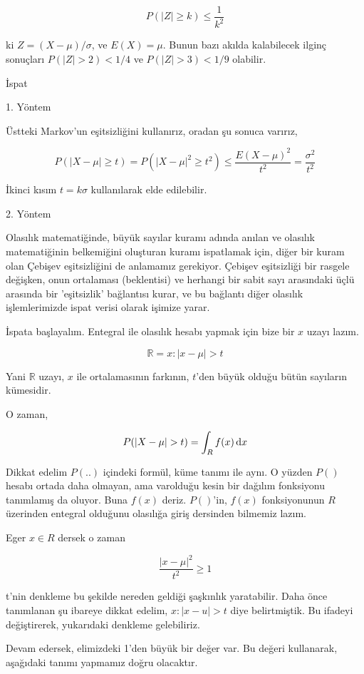 \documentclass[12pt,fleqn]{article}\usepackage{../../common}
\begin{document}
$$ P(|Z| \ge k) \le \frac{1}{k^2}$$

ki $Z = (X-\mu)/\sigma$, ve $E(X) = \mu$. Bunun bazı akılda kalabilecek
ilginç sonuçları $P(|Z| > 2) < 1/4$ ve $P(|Z| > 3) < 1/9$ olabilir.

İspat

1. Yöntem

Üstteki Markov'un eşitsizliğini kullanırız, oradan şu sonuca varırız, 

$$ 
P(|X-\mu| \ge t) = P(|X-\mu|^2 \ge t^2 ) \le \frac{E(X-\mu)^2}{t^2} 
= \frac{\sigma^2}{t^2}  
$$

İkinci kısım $t=k\sigma$ kullanılarak elde edilebilir.

2. Yöntem

Olasılık matematiğinde, büyük sayılar kuramı adında anılan ve olasılık
matematiğinin belkemiğini oluşturan kuramı ispatlamak için, diğer bir kuram
olan Çebişev eşitsizliğini de anlamamız gerekiyor. Çebişev eşitsizliği bir
rasgele değişken, onun ortalaması (beklentisi) ve herhangi bir sabit sayı
arasındaki üçlü arasında bir 'eşitsizlik' bağlantısı kurar, ve bu bağlantı
diğer olasılık işlemlerimizde ispat verisi olarak işimize yarar.



İspata başlayalım. Entegral ile olasılık hesabı yapmak için bize bir $x$
uzayı lazım.

$$ \mathbb{R} = {x: |x-\mu| > t} $$

Yani $\mathbb{R}$ uzayı, $x$ ile ortalamasının farkının, $t$'den büyük olduğu bütün
sayıların kümesidir.

O zaman, 

$$ P(|X-\mu| > t) = \int_R f(x) \,\mathrm{d} x $$

Dikkat edelim $P(..)$ içindeki formül, küme tanımı ile aynı. O yüzden $P()$
hesabı ortada daha olmayan, ama varolduğu kesin bir dağılım fonksiyonu
tanımlamış da oluyor. Buna $f(x)$ deriz. $P()$'in, $f(x)$ fonksiyonunun $R$
üzerinden entegral olduğunu olasılığa giriş dersinden bilmemiz lazım. 

Eger $x \in R$ dersek o zaman

$$ \frac{|x-\mu|^2}{t^2} \ge 1 $$

t'nin denkleme bu şekilde nereden geldiği şaşkınlık yaratabilir. Daha önce
tanımlanan şu ibareye dikkat edelim, $x: |x-u| > t$ diye belirtmiştik. Bu
ifadeyi değiştirerek, yukarıdaki denkleme gelebiliriz.

Devam edersek, elimizdeki 1'den büyük bir değer var. Bu değeri kullanarak,
aşağıdaki tanımı yapmamız doğru olacaktır.
\end{document}
